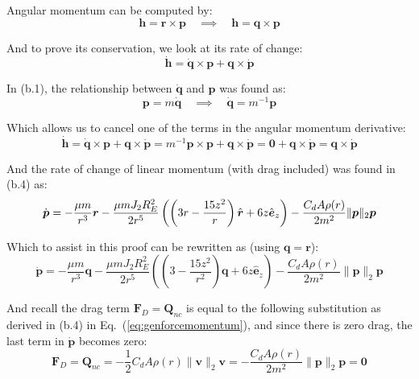 \documentclass[titlepage]{article}
\begin{document}
Angular momentum can be computed by:
\begin{equation}
	\boldsymbol{h}=\boldsymbol{r}\times\boldsymbol{p}\quad\implies\quad\boldsymbol{h}=\boldsymbol{q}\times\boldsymbol{p}
\end{equation}

And to prove its conservation, we look at its rate of change:
\begin{equation}
	\dot{\boldsymbol{h}}=\dot{\boldsymbol{q}}\times\boldsymbol{p}+\boldsymbol{q}\times\dot{\boldsymbol{p}}
\end{equation}

In (b.1), the relationship between $\dot{\boldsymbol{q}}$ and $\boldsymbol{p}$ was found as:
\begin{equation}
	\boldsymbol{p}=m\dot{\boldsymbol{q}}\quad\implies\quad\dot{\boldsymbol{q}}=m^{-1}\boldsymbol{p}
\end{equation}

Which allows us to cancel one of the terms in the angular momentum derivative:
\begin{equation}
	\dot{\boldsymbol{h}}=\dot{\boldsymbol{q}}\times\boldsymbol{p}+\boldsymbol{q}\times\dot{\boldsymbol{p}}=m^{-1}\boldsymbol{p}\times\boldsymbol{p}+\boldsymbol{q}\times\dot{\boldsymbol{p}}=\boldsymbol{0}+\boldsymbol{q}\times\dot{\boldsymbol{p}}=\boldsymbol{q}\times\dot{\boldsymbol{p}}
\end{equation}

And the rate of change of linear momentum (with drag included) was found in (b.4) as:
\begin{equation}
	\dot{\boldsymbol{p}}=-\frac{\mu m}{r^3}\boldsymbol{r}-\frac{\mu mJ_2R_E^2}{2r^5}\left(\left(3r-\frac{15z^2}{r}\right)\hat{\boldsymbol{r}}+6z\hat{\boldsymbol{e}}_z\right)-\frac{C_dA\rho(r)}{2m^2}\|\boldsymbol{p}\|_2\boldsymbol{p} \\
\end{equation}

Which to assist in this proof can be rewritten as (using $\boldsymbol{q}=\boldsymbol{r}$):
\begin{equation}
	\dot{\boldsymbol{p}}=-\frac{\mu m}{r^3}\boldsymbol{q}-\frac{\mu mJ_2R_E^2}{2r^5}\left(\left(3-\frac{15z^2}{r^2}\right)\boldsymbol{q}+6z\hat{\boldsymbol{e}}_z\right)-\frac{C_dA\rho(r)}{2m^2}\|\boldsymbol{p}\|_2\boldsymbol{p}
\end{equation}

And recall the drag term $\boldsymbol{F}_D=\boldsymbol{Q}_{nc}$ is equal to the following substitution as derived in (b.4) in Eq.~(\ref{eq:genforcemomentum}), and since there is zero drag, the last term in $\dot{\boldsymbol{p}}$ becomes zero:
\begin{equation}
	\boldsymbol{F}_D=\boldsymbol{Q}_{nc}=-\frac{1}{2}C_dA\rho(r)\|\boldsymbol{v}\|_2\boldsymbol{v}=-\frac{C_dA\rho(r)}{2m^2}\|\boldsymbol{p}\|_2\boldsymbol{p}=\boldsymbol{0}
\end{equation}
\end{document}
